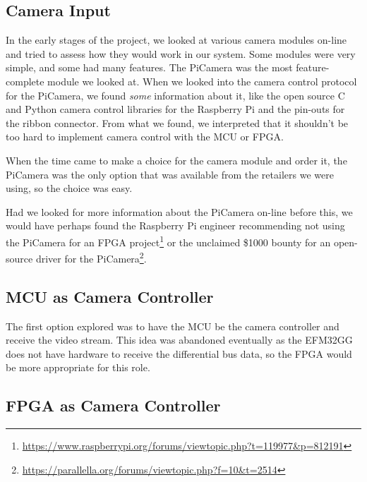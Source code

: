 \subsection{Camera Input}
\label{sec:camera_discussion}
In the early stages of the project,
we looked at various camera modules on-line and tried to assess how they would work in our system.
Some modules were very simple, and some had many features.
The PiCamera was the most feature-complete module we looked at.
When we looked into the camera control protocol for the PiCamera,
we found \textit{some} information about it,
like the open source C and Python camera control libraries for the Raspberry Pi
and the pin-outs for the ribbon connector.
From what we found, we interpreted that it shouldn't be too hard to implement camera control with the MCU or FPGA.

When the time came to make a choice for the camera module and order it,
the PiCamera was the only option that was available from the retailers we were using,
so the choice was easy.

Had we looked for more information about the PiCamera on-line before this,
we would have perhaps found the Raspberry Pi engineer recommending not using the PiCamera for an FPGA project\footnote{\url{https://www.raspberrypi.org/forums/viewtopic.php?t=119977&p=812191}} or the unclaimed \$1000 bounty for an open-source driver for the PiCamera\footnote{\url{https://parallella.org/forums/viewtopic.php?f=10&t=2514}}.

\subsection{MCU as Camera Controller}

The first option explored was to have the MCU be the camera controller and receive the video stream.
This idea was abandoned eventually as the EFM32GG does not have hardware to receive the differential bus data,
so the FPGA would be more appropriate for this role.

\subsection{FPGA as Camera Controller}

